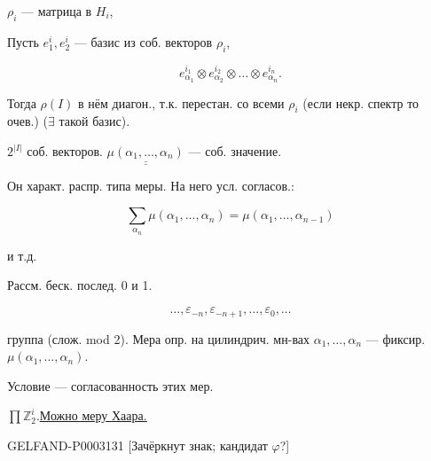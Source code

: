 \hfill{}

$\rho_i$ --- матрица в $H_i$,

Пусть $e_1^i,e_2^i$ --- базис из соб. векторов $\rho_i$,

\begin{equation*}e_{\alpha_1}^{i_1}\otimes e_{\alpha_2}^{i_2}\otimes\ldots\otimes e_{\alpha_n}^{i_n}.\end{equation*}

Тогда $\rho(I)$ в нём диагон., т.к. перестан. со всеми $\rho_i$ (если некр. спектр то очев.) ($\exists$ такой базис).

$2^{|I|}$ соб. векторов. $\underline{\underline{\mu(\alpha_1,\ldots,\alpha_n)}}$ --- соб. значение.





Он характ. распр. типа меры. На него усл. согласов.:

\begin{equation*}\sum_{\alpha_n}\mu(\alpha_1,\ldots,\alpha_n)=\mu(\alpha_1,\ldots,\alpha_{n-1})\end{equation*}

и т.д.

Рассм. беск. послед. 0 и 1.

\begin{equation*}\ldots,\varepsilon_{-n},\varepsilon_{-n+1},\ldots,\varepsilon_0,\ldots\end{equation*}

группа (слож. mod 2). Мера опр. на цилиндрич. мн-вах $\alpha_1,\ldots,\alpha_n$ --- фиксир. $\mu(\alpha_1,\ldots,\alpha_n)$.

Условие --- согласованность этих мер.

$\prod\mathbb Z_2^i$.\qquad\uline{\uline{Можно меру Хаара.}}

\begin{GelfandAdjacentEvidence}{GELFAND-P000313}{1}
[Зачёркнут знак; кандидат $\varphi$?] 



\end{GelfandAdjacentEvidence}


